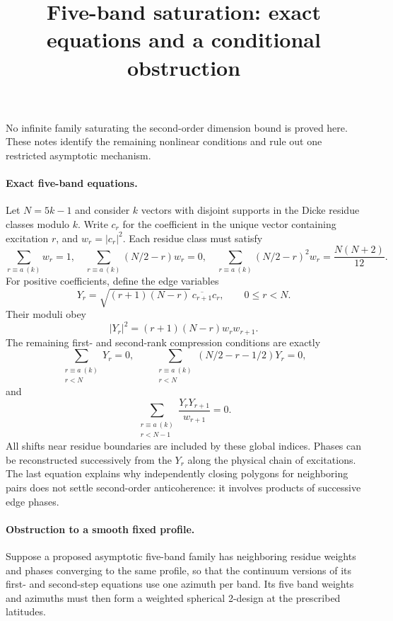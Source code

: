 \documentclass{article}
\begin{document}
\title{Five-band saturation: exact equations and a conditional obstruction}
\author{}\date{}\maketitle

No infinite family saturating the second-order dimension bound is proved
here. These notes identify the remaining nonlinear conditions and rule out
one restricted asymptotic mechanism.

\paragraph{Exact five-band equations.}
Let $N=5k-1$ and consider $k$ vectors with disjoint supports in the Dicke
residue classes modulo $k$. Write $c_r$ for the coefficient in the unique
vector containing excitation $r$, and $w_r=|c_r|^2$. Each residue class
must satisfy
\[
 \sum_{r\equiv a\ (k)} w_r=1,\quad
 \sum_{r\equiv a\ (k)} (N/2-r)w_r=0,\quad
 \sum_{r\equiv a\ (k)} (N/2-r)^2w_r=\frac{N(N+2)}{12}.
\]
For positive coefficients, define the edge variables
\[
 Y_r=\sqrt{(r+1)(N-r)}\,\overline{c_{r+1}}c_r,
 \qquad 0\le r<N.
\]
Their moduli obey
\[
 |Y_r|^2=(r+1)(N-r)w_rw_{r+1}.
\]
The remaining first- and second-rank compression conditions are exactly
\[
 \sum_{\substack{r\equiv a\ (k)\\r<N}}Y_r=0,\qquad
 \sum_{\substack{r\equiv a\ (k)\\r<N}}(N/2-r-1/2)Y_r=0,
\]
and
\[
 \sum_{\substack{r\equiv a\ (k)\\r<N-1}}
 \frac{Y_rY_{r+1}}{w_{r+1}}=0.
\]
All shifts near residue boundaries are included by these global indices.
Phases can be reconstructed successively from the $Y_r$ along the physical
chain of excitations. The last equation explains why independently closing
polygons for neighboring pairs does not settle second-order anticoherence:
it involves products of successive edge phases.

\paragraph{Obstruction to a smooth fixed profile.}
Suppose a proposed asymptotic five-band family has neighboring residue
weights and phases converging to the same profile, so that the continuum
versions of its first- and second-step equations use one azimuth per band.
Its five band weights and azimuths must then form a weighted spherical
2-design at the prescribed latitudes.
\end{document}
